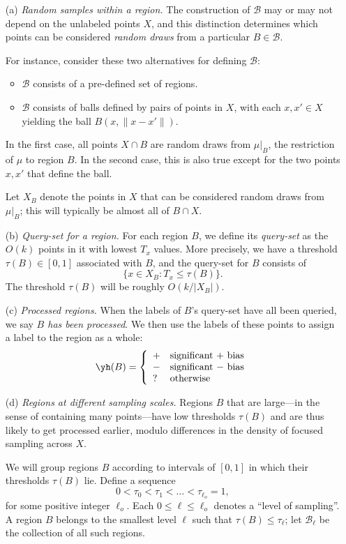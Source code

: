 \documentclass{article}
\def\B{{\mathcal B}}
\begin{document}
\begin{enumerate}
\begin{enumerate}
\item[(a)] {\it Random samples within a region.} The construction of $\B$ may or may not depend on the unlabeled points $X$, and this distinction determines which points can be considered {\it random draws} from a particular $B \in \B$.  

For instance, consider these two alternatives for defining $\B$:
\begin{itemize}
\item $\B$ consists of a pre-defined set of regions.
\item $\B$ consists of balls defined by pairs of points in $X$, with each $x,x' \in X$ yielding the ball $B(x,\|x-x'\|)$.
\end{itemize}
In the first case, all points $X \cap B$ are random draws from $\mu|_B$, the restriction of $\mu$ to region $B$. In the second case, this is also true except for the two points $x,x'$ that define the ball.

Let $X_B$ denote the points in $X$ that can be considered random draws from $\mu|_B$; this will typically be almost all of $B \cap X$. 

\item[(b)] {\it Query-set for a region.} For each region $B$, we define its {\it query-set} as the $O(k)$ points in it with lowest $T_x$ values. More precisely, we have a threshold $\tau(B) \in [0,1]$  associated with $B$, and the query-set for $B$ consists of 
$$\{x \in X_B: T_x \leq \tau(B)\} .$$ 
The threshold $\tau(B)$ will be roughly $O(k/|X_B|)$.

\item[(c)] {\it Processed regions.} When the labels of $B$'s query-set have all been queried, we say {\it $B$ has been processed}. We then use the labels of these points to assign a label to the region as a whole:
$$ \yh(B) = 
\left\{
\begin{array}{ll}
+ & \mbox{significant $+$ bias} \\
- & \mbox{significant $-$ bias} \\
? & \mbox{otherwise}
\end{array}
\right.
$$

\item[(d)] {\it Regions at different sampling scales.} Regions $B$ that are large---in the sense of containing many points---have low thresholds $\tau(B)$ and are thus likely to get processed earlier, modulo differences in the density of focused sampling across $X$.

We will group regions $B$ according to intervals of $[0,1]$ in which their thresholds $\tau(B)$ lie. Define a sequence 
$$ 0 < \tau_0 < \tau_1 < \ldots < \tau_{\ell_o} = 1, $$
for some positive integer $\ell_o$. Each $0 \leq \ell \leq \ell_o$ denotes a ``level of sampling''. A region $B$ belongs to the smallest level $\ell$ such that $\tau(B) \leq \tau_\ell$; let $\B_\ell$ be the collection of all such regions.


\end{enumerate}
\end{enumerate}
\end{document}

